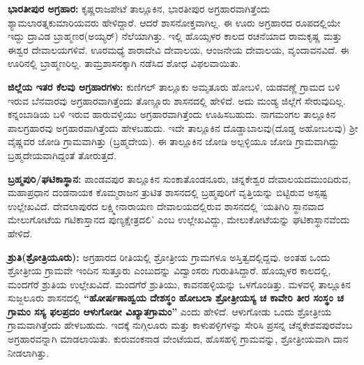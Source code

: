 \vskip -2pt

\textbf{ಭಾರತೀಪುರ ಅಗ್ರಹಾರ:} ಕೃಷ್ಣರಾಜಪೇಟೆ ತಾಲ್ಲೂಕಿನ, ಭಾರತೀಪುರ ಅಗ್ರಹಾರವಾಗಿತ್ತೆಂದು ಶ್ಯಾಮಲಾರತ್ನಕುಮಾರಿ\-ಯವರು ಹೇಳಿದ್ದಾರೆ. ಆದರೆ ಶಾಸನೋಕ್ತವಾಗಿಲ್ಲ. ಈ ಊರು ಅಗ್ರಹಾರದ ರೂಪದಲ್ಲಿಯೇ ಇದ್ದು ದ್ರಾವಿಡ ಬ್ರಾಹ್ಮಣರ(ಅಯ್ಯರ್​) ನೆಲೆಯಾಗಿತ್ತು. ಇಲ್ಲಿ ಹೊಯ್ಸಳರ ಕಾಲದ ರಚನೆಯಾದ ರಾಮಕೃಷ್ಣ ಮತ್ತು ಈಶ್ವರ ದೇವಾಲಯಗಳಿವೆ. ಊರಮಧ್ಯೆ ಶಾರಾದೇವಿ ದೇವಾಲಯ, ಆಂಜನೇಯ ದೇವಾಲಯ, ವೃಂದಾವನವಿದೆ. ಈ ಊರಿನಲ್ಲಿ ಬ್ರಾಹ್ಮಣರಿಲ್ಲ. ತಾಮ್ರಶಾಸನಕ್ಕಾಗಿ ನಡೆಸಿದ ಶೋಧ ವಿಫಲವಾಯಿತು.

\textbf{ಜಿಲ್ಲೆಯ ಇತರ ಕೆಲವು ಅಗ್ರಹಾರಗಳು:} ಕುಣಿಗಲ್​ ತಾಲ್ಲೂಕು ಅಮೃತೂರು ಹೋಬಳಿ, ಯಡವಣ್ಣೆ ಗ್ರಾಮದ ಬಳಿ ಇರುವ ಬೆನವಾರವು ಅಗ್ರಹಾರವಾಗಿತ್ತೆಂದು ತೊಣ್ಣೂರು ಶಾಸನದಲ್ಲಿ ಹೇಳಿದೆ. ಅದು ಮಂಡ್ಯ ಜಿಲ್ಲೆಗೆ ಸೇರುವುದಿಲ್ಲ. ಕನ್ನಂಬಾಡಿಯ ಬಳಿ ಇರುವ ಹಾರುವಳ್ಳಿಯು ಅಗ್ರಹಾರವಾಗಿತ್ತೆಂದು ಊಹಿಸಬಹುದು. ನಾಗಮಂಗಲ ತಾಲ್ಲೂಕಿನ ಪಾಲಗ್ರಹಾರವು ಅಗ್ರಹಾರವಾಗಿತ್ತೆಂದು ಹೇಳಬಹುದು. ಇದೇ ತಾಲ್ಲೂಕಿನ ದೊಡ್ಡಾಬಾಲವು(ದೊಡ್ಡ ಅಹೋಬಲವು) ಶ‍್ರೀ ವೈಷ್ಣವರ ಜೋಡಿ ಗ್ರಾಮವಾಗಿತ್ತು (ಬ್ರಹ್ಮದೇಯ). ಈ ತಾಲ್ಲೂಕಿನ ಜೋಡಿ ಅಲ್ಪಳ್ಳಿಯೂ ಜೋಡಿ ಗ್ರಾಮವಾಗಿದ್ದು ಬ್ರಹ್ಮದೇಯವಾಗಿದ್ದಂತೆ ತೋರುತ್ತದೆ.

\textbf{ಬ್ರಹ್ಮಪುರಿ/ಘಟಿಕಾಸ್ಥಾನ:} ಪಾಂಡವಪುರ ತಾಲ್ಲೂಕಿನ ಸುಂಕಾತೊಂಡನೂರು, ಚನ್ನಕೇಶ್ವರ ದೇವಾಲಯದ\break ಮುಂದಿರುವ, ಮಹಾಪ್ರಧಾನ ದಂಡನಾಯಕ ಕೊಮ್ಮರಾಜನ ತ್ರುಟಿತ ಶಾಸನದಲ್ಲಿ ಬ್ರಹ್ಮಪುರಿಗೆ ವೃತ್ತಿಯನ್ನು ಬಿಟ್ಟಿರುವ ಅಸ್ಪಷ್ಟ ಉಲ್ಲೇಖವಿದೆ. ದೇವಲಾಪುರದ ಲಕ್ಷ್ಮೀನಾರಾಯಣ ದೇವಾಲಯದಲ್ಲಿರುವ ಶಾಸನದಲ್ಲಿ ‘ಯತಿಗಿರಿ ಸ್ಥಾನವಾದ ಮೇಲುಗೋಟೆಯ ಗಟಿಕಾಸ್ತಾನದ ಪುಣ್ಯಕ್ಷೇತ್ರದಲಿ’ ಎಂಬ ಉಲ್ಲೇಖವಿದ್ದು, ಮೇಲುಕೋಟೆಯನ್ನು ಘಟಿಕಾಸ್ಥಾನವೆಂದು ಹೇಳಿದೆ.

\textbf{ಶ್ರುತಿ(ಶ್ರೋತ್ರಿಯೂರು):} ಅಗ್ರಹಾರದ ರೀತಿಯಲ್ಲಿ ಶ್ರೋತ್ರೀಯ ಗ್ರಾಮಗಳೂ ಅಸ್ತಿತ್ವದಲ್ಲಿದ್ದವು. ಅಂತಹ ಒಂದು ಶ್ರೋತ್ರೀಯ ಗ್ರಾಮವೇ ಇಂದಿನ ಸುತ್ತೂರು ಎಂಬುದನ್ನು ವಿದ್ವಾಂಸರು ಗುರುತಿಸಿದ್ದಾರೆ. ಹೊಯ್ಸಳರ ಕಾಲದಲ್ಲಿ, ಮಂದಗೆರೆ ಶ್ರುತಿಯ ಉಲ್ಲೇಖವಿದೆ. ಮಂದಗೆರೆ ಶ್ರುತಿಯು, ಕಾವನಹಳ್ಳಿಯನ್ನು ಒಳಗೊಂಡಿತ್ತು. ಮಳವಳ್ಳಿ ತಾಲ್ಲೂಕಿನ ಸುಜ್ಜಲೂರು ಶಾಸನದಲ್ಲಿ \textbf{“ಹೋರ್ಷಣಾಹ್ವಯ ದೇಶಸ್ಥಂ ಹೋಬಲಾ ಶ್ರೋತ್ರೀಯಸ್ಯ ಚ ಕಾವೇರಿ ತೀರ ಸಂಸ್ಥಂ ಚ ಗ್ರಾಮಂ ಸಸ್ಯ ಫಲಪ್ರದಂ ಆಳುಗೋಡೀ ವಿಖ್ಯಾತಗ್ರಾಮಂ”} ಎಂದು ಹೇಳಿದೆ. ಆಳುಗೋಡು ಒಂದು ಶ್ರೋತ್ರೀಯ ಗ್ರಾಮವಾಗಿತ್ತೆಂದು ಹೇಳಬಹುದು. ಇದಕ್ಕೆ ನುಗ್ಗಿಲೂರು ಮತ್ತು ಕಾಳುಪಳ್ಳಿಗಳನ್ನು ಸೇರಿಸಿ ಪ್ರಸನ್ನ ಚೆನ್ನಕೇಶವಪುರವೆಂಬ ಅಗ್ರಹಾರವನ್ನಾಗಿ ಮಾಡಲಾಯಿತು. ಕುರುವಂಕನಾಡ ವೇಂಟೆಯದ, ಹೊಸಹಳ್ಳಿ ಗ್ರಾಮವನ್ನು, ಶ್ರೋತ್ರೀಯವಾಗಿ ದಾನ ನೀಡಲಾಗಿತ್ತು.


